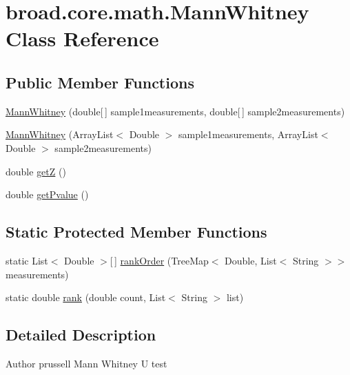 \hypertarget{classbroad_1_1core_1_1math_1_1_mann_whitney}{\section{broad.\+core.\+math.\+Mann\+Whitney Class Reference}
\label{classbroad_1_1core_1_1math_1_1_mann_whitney}
}
\subsection*{Public Member Functions}
\begin{DoxyCompactItemize}
\item 
\hyperlink{classbroad_1_1core_1_1math_1_1_mann_whitney_a3a06fe081ec04fc21396398f34c7ebdc}{Mann\+Whitney} (double\mbox{[}$\,$\mbox{]} sample1measurements, double\mbox{[}$\,$\mbox{]} sample2measurements)
\item 
\hyperlink{classbroad_1_1core_1_1math_1_1_mann_whitney_a38542b8fc92fff5d1f8c7a8bd35895ef}{Mann\+Whitney} (Array\+List$<$ Double $>$ sample1measurements, Array\+List$<$ Double $>$ sample2measurements)
\item 
double \hyperlink{classbroad_1_1core_1_1math_1_1_mann_whitney_a867f8251b41b686641161b5c8311eca4}{get\+Z} ()
\item 
double \hyperlink{classbroad_1_1core_1_1math_1_1_mann_whitney_af7a5889f4e6283800d73e8828421705a}{get\+Pvalue} ()
\end{DoxyCompactItemize}
\subsection*{Static Protected Member Functions}
\begin{DoxyCompactItemize}
\item 
static List$<$ Double $>$\mbox{[}$\,$\mbox{]} \hyperlink{classbroad_1_1core_1_1math_1_1_mann_whitney_a2a176d1549b964e9e68a8647a78d37f0}{rank\+Order} (Tree\+Map$<$ Double, List$<$ String $>$$>$ measurements)
\item 
static double \hyperlink{classbroad_1_1core_1_1math_1_1_mann_whitney_a93d65e7b163a0bc7c0220d3fe3b10d18}{rank} (double count, List$<$ String $>$ list)
\end{DoxyCompactItemize}


\subsection{Detailed Description}
\begin{DoxyAuthor}{Author}
prussell Mann Whitney U test 
\end{DoxyAuthor}


